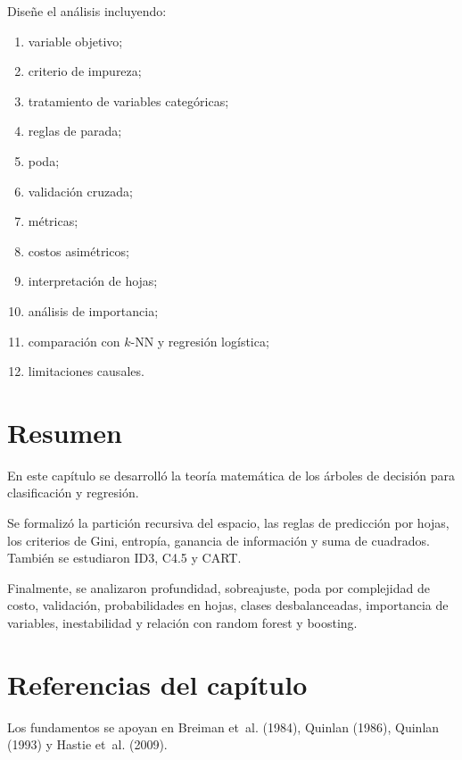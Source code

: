 \documentclass[
  spanish,
  10.5pt,
  letterpaper,
  DIV=11,
  numbers=noendperiod,
  oneside,
  open=any]{scrreprt}
\providecommand{\tightlist}{%
  \setlength{\itemsep}{0pt}\setlength{\parskip}{0pt}}
\theoremstyle{definition}
\theoremstyle{definition}
\theoremstyle{plain}
\theoremstyle{remark}
\begin{document}
Diseñe el análisis incluyendo:

\begin{enumerate}
\def\labelenumi{\arabic{enumi}.}
\tightlist
\item
  variable objetivo;
\item
  criterio de impureza;
\item
  tratamiento de variables categóricas;
\item
  reglas de parada;
\item
  poda;
\item
  validación cruzada;
\item
  métricas;
\item
  costos asimétricos;
\item
  interpretación de hojas;
\item
  análisis de importancia;
\item
  comparación con \(k\)-NN y regresión logística;
\item
  limitaciones causales.
\end{enumerate}

\section*{Resumen}\label{resumen-11}


En este capítulo se desarrolló la teoría matemática de los árboles de
decisión para clasificación y regresión.

Se formalizó la partición recursiva del espacio, las reglas de
predicción por hojas, los criterios de Gini, entropía, ganancia de
información y suma de cuadrados. También se estudiaron ID3, C4.5 y CART.

Finalmente, se analizaron profundidad, sobreajuste, poda por complejidad
de costo, validación, probabilidades en hojas, clases desbalanceadas,
importancia de variables, inestabilidad y relación con random forest y
boosting.

\section*{Referencias del
capítulo}\label{referencias-del-capuxedtulo-12}


Los fundamentos se apoyan en Breiman et~al. (1984), Quinlan (1986),
Quinlan (1993) y Hastie et~al. (2009).
\end{document}
